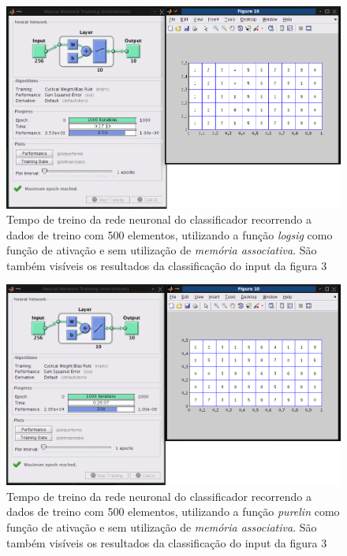 \documentclass{article}
\begin{document}
\begin{figure}[h]
  \centering
      \includegraphics[scale=0.3]{500_Sigmoidal.png}
  \caption{Tempo de treino da rede neuronal do classificador recorrendo a dados de treino com 500 elementos, utilizando a função \emph{logsig} como função de ativação e sem utilização de \emph{memória associativa}. São também visíveis os resultados da classificação do input da figura 3}
\end{figure}

\begin{figure}[h]
  \centering
      \includegraphics[scale=0.3]{500_Linear.png}
  \caption{Tempo de treino da rede neuronal do classificador recorrendo a dados de treino com 500 elementos, utilizando a função \emph{purelin} como função de ativação e sem utilização de \emph{memória associativa}. São também visíveis os resultados da classificação do input da figura 3}
\end{figure}
\end{document}
